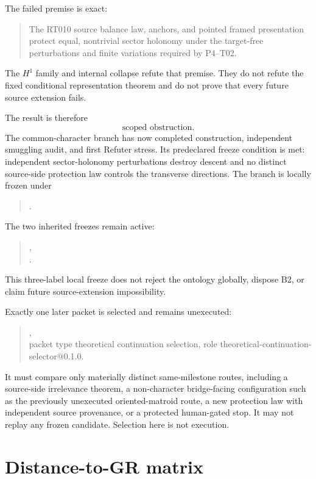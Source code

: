 \documentclass[11pt]{article}
\newcommand{\status}[1]{\textsf{#1}}
\begin{document}
The failed premise is exact:
\begin{quote}
The RT010 source balance law, anchors, and pointed framed presentation protect
equal, nontrivial sector holonomy under the target-free perturbations and
finite variations required by P4--T02.
\end{quote}
The $H^1$ family and internal collapse refute that premise.  They do not refute
the fixed conditional representation theorem and do not prove that every
future source extension fails.

The result is therefore
\[
 \boxed{\text{scoped obstruction}.}
\]
The common-character branch has now completed construction, independent
smuggling audit, and first Refuter stress.  Its predeclared freeze condition is
met: independent sector-holonomy perturbations destroy descent and no distinct
source-side protection law controls the transverse directions.  The branch is
locally frozen under
\begin{quote}
\small{}.
\end{quote}
The two inherited freezes remain active:
\begin{quote}
\small
{},\\
.
\end{quote}
This three-label local freeze does not reject the ontology globally, dispose
B2, or claim future source-extension impossibility.

Exactly one later packet is selected and remains unexecuted:
\begin{quote}
\small{},\\
packet type \status{theoretical continuation selection}, role
\status{theoretical-continuation-selector@0.1.0}.
\end{quote}
It must compare only materially distinct same-milestone routes, including a
source-side irrelevance theorem, a non-character bridge-facing configuration
such as the previously unexecuted oriented-matroid route, a new protection law
with independent source provenance, or a protected human-gated stop.  It may
not replay any frozen candidate.  Selection here is not execution.

\section{Distance-to-GR matrix}
\end{document}
